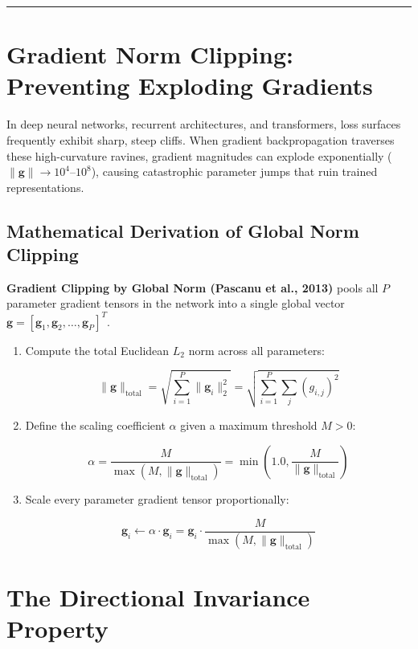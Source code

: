 \documentclass[
  letterpaper,
]{scrbook}
\begin{document}
\begin{center}\rule{0.5\linewidth}{0.5pt}\end{center}

\section{Gradient Norm Clipping: Preventing Exploding
Gradients}\label{gradient-norm-clipping-preventing-exploding-gradients}

In deep neural networks, recurrent architectures, and transformers, loss
surfaces frequently exhibit sharp, steep cliffs. When gradient
backpropagation traverses these high-curvature ravines, gradient
magnitudes can explode exponentially
(\(\|\mathbf{g}\| \to 10^4\text{--}10^8\)), causing catastrophic
parameter jumps that ruin trained representations.

\subsection{Mathematical Derivation of Global Norm
Clipping}\label{mathematical-derivation-of-global-norm-clipping}

\textbf{Gradient Clipping by Global Norm (Pascanu et al., 2013)} pools
all \(P\) parameter gradient tensors in the network into a single global
vector
\(\mathbf{g} = [\mathbf{g}_1, \mathbf{g}_2, \dots, \mathbf{g}_P]^T\).

\begin{enumerate}
\def\labelenumi{\arabic{enumi}.}
\item
  Compute the total Euclidean \(L_2\) norm across all parameters:

  \[\|\mathbf{g}\|_{\text{total}} = \sqrt{\sum_{i=1}^P \|\mathbf{g}_i\|_2^2} = \sqrt{\sum_{i=1}^P \sum_{j} (g_{i,j})^2}\]
\item
  Define the scaling coefficient \(\alpha\) given a maximum threshold
  \(M > 0\):

  \[\alpha = \frac{M}{\max(M, \|\mathbf{g}\|_{\text{total}})} = \min\left(1.0, \frac{M}{\|\mathbf{g}\|_{\text{total}}}\right)\]
\item
  Scale every parameter gradient tensor proportionally:

  \[\mathbf{g}_i \longleftarrow \alpha \cdot \mathbf{g}_i = \mathbf{g}_i \cdot \frac{M}{\max(M, \|\mathbf{g}\|_{\text{total}})}\]
\end{enumerate}

\section{The Directional Invariance
Property}\label{the-directional-invariance-property}
\end{document}

